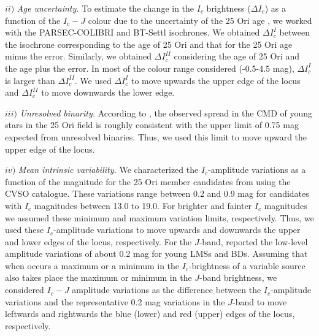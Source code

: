 \documentclass[12pt]{article}
\begin{document}

$ii)$ \emph{Age uncertainty.} To estimate the change in the $I_c$ brightness ($\Delta I_c$) as a function of the $I_c-J$ colour due to the uncertainty of the 25 Ori age \citep[6.1$\pm$2.4; ][]{Briceno2018}, we worked with the PARSEC-COLIBRI and BT-Settl isochrones. We obtained $\Delta I_c^I$ between the isochrone corresponding to the age of 25 Ori and that for the 25 Ori age minus the error. Similarly, we obtained $\Delta I_c^{II}$ considering the age of 25 Ori and the age plus the error. In most of the colour range considered (-0.5-4.5 mag), $\Delta I_c^I$ is larger than $\Delta I_c^{II}$. We used $\Delta I_c^I$ to move upwards the upper edge of the locus and $\Delta I_c^{II}$ to move downwards the lower edge.


$iii)$ \emph{Unresolved binarity.} According to \citet{Briceno2007}, the observed spread in the CMD of young stars in the 25 Ori field is roughly consistent with the upper limit of 0.75 mag expected from unresolved binaries. Thus, we used this limit to move upward the upper edge of the locus.

$iv)$ \emph{Mean intrinsic variability.} We characterized the $I_c$-amplitude variations as a function of the magnitude for the 25 Ori member candidates from \citet{Downes2014} using the CVSO catalogue. These variations range between 0.2 and 0.9 mag for candidates with $I_c$ magnitudes between 13.0 to 19.0. For brighter and fainter $I_c$ magnitudes we assumed these minimum and maximum variation limits, respectively. Thus, we used these $I_c$-amplitude variations to move upwards and downwards the upper and lower edges of the locus, respectively. For the $J$-band, \citet{Scholz2009} reported the low-level amplitude variations of about 0.2 mag for young LMSs and BDs. Assuming that when occurs a maximum or a minimum in the $I_c$-brightness of a variable source also takes place the maximum or minimum in the $J$-band brightness, we considered $I_c-J$ amplitude variations as the difference between the $I_c$-amplitude variations and the representative 0.2 mag variations in the $J$-band to move leftwards and rightwards the blue (lower) and red (upper) edges of the locus, respectively.
\end{document}
